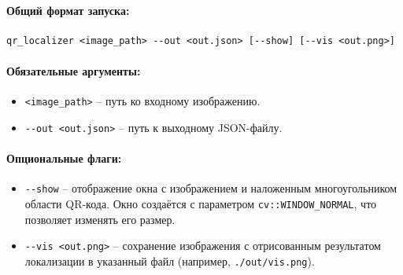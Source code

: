 \paragraph{Общий формат запуска:}
\begin{verbatim}
qr_localizer <image_path> --out <out.json> [--show] [--vis <out.png>]
\end{verbatim}

\paragraph{Обязательные аргументы:}
\begin{itemize}
	\item \verb|<image_path>| -- путь ко входному изображению.
	\item \verb|--out <out.json>| -- путь к выходному JSON-файлу.
\end{itemize}

\paragraph{Опциональные флаги:}
\begin{itemize}
	\item \verb|--show| -- отображение окна с изображением и наложенным многоугольником области QR-кода.
	      Окно создаётся с параметром \verb|cv::WINDOW_NORMAL|, что позволяет изменять его размер.
	\item \verb|--vis <out.png>| -- сохранение изображения с отрисованным результатом локализации в указанный файл (например, \verb|./out/vis.png|).
\end{itemize}
